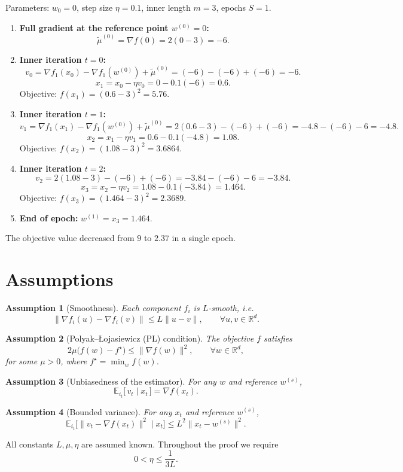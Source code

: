\documentclass{article}
\newtheorem{assumption}{Assumption}
\begin{document}
Parameters: $w_0=0$, step size $\eta=0.1$, inner length $m=3$, epochs $S=1$.

\begin{enumerate}
\item \textbf{Full gradient at the reference point $w^{(0)}=0$:}
\[
\tilde{\mu}^{(0)}=\nabla f(0)=2(0-3)=-6 .
\]

\item \textbf{Inner iteration $t=0$:}
\[
v_0 = \nabla f_1(x_0)-\nabla f_1(w^{(0)})+\tilde{\mu}^{(0)}
      = (-6)-(-6)+(-6) = -6 .
\]
\[
x_1 = x_0-\eta v_0 = 0-0.1(-6)=0.6 .
\]
Objective: $f(x_1)=(0.6-3)^2=5.76$.

\item \textbf{Inner iteration $t=1$:}
\[
v_1 = \nabla f_1(x_1)-\nabla f_1(w^{(0)})+\tilde{\mu}^{(0)}
      = 2(0.6-3)-(-6)+(-6)= -4.8-(-6)-6 = -4.8 .
\]
\[
x_2 = x_1-\eta v_1 = 0.6-0.1(-4.8)=1.08 .
\]
Objective: $f(x_2)=(1.08-3)^2=3.6864$.

\item \textbf{Inner iteration $t=2$:}
\[
v_2 = 2(1.08-3)-(-6)+(-6)= -3.84-(-6)-6 = -3.84 .
\]
\[
x_3 = x_2-\eta v_2 = 1.08-0.1(-3.84)=1.464 .
\]
Objective: $f(x_3)=(1.464-3)^2=2.3689$.

\item \textbf{End of epoch:} $w^{(1)}=x_3=1.464$.
\end{enumerate}
The objective value decreased from $9$ to $2.37$ in a single epoch.

\newpage
\section*{Assumptions}
\begin{assumption}[Smoothness]\label{ass:smooth}
Each component $f_i$ is $L$‑smooth, i.e.
\[
\|\nabla f_i(u)-\nabla f_i(v)\|\le L\|u-v\|,\qquad \forall u,v\in\mathbb{R}^d .
\]
\end{assumption}
\begin{assumption}[Polyak–Łojasiewicz (PL) condition]\label{ass:PL}
The objective $f$ satisfies
\[
2\mu\bigl(f(w)-f^\star\bigr)\le \|\nabla f(w)\|^2,\qquad \forall w\in\mathbb{R}^d ,
\]
for some $\mu>0$, where $f^\star=\min_w f(w)$.
\end{assumption}
\begin{assumption}[Unbiasedness of the estimator]\label{ass:unbiased}
For any $w$ and reference $w^{(s)}$,
\[
\mathbb{E}_{i_t}\bigl[\,v_t\mid x_t\,\bigr]=\nabla f(x_t) .
\]
\end{assumption}
\begin{assumption}[Bounded variance]\label{ass:var}
For any $x_t$ and reference $w^{(s)}$,
\[
\mathbb{E}_{i_t}\bigl[\|v_t-\nabla f(x_t)\|^2\mid x_t\bigr]
    \le L^2\|x_t-w^{(s)}\|^2 .
\]
\end{assumption}
All constants $L,\mu,\eta$ are assumed known. Throughout the proof we require
\[
0<\eta\le \frac{1}{3L}.
\tag{A1}
\]
\end{document}
